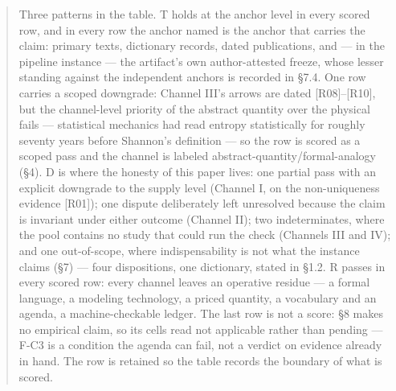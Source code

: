 \documentclass[11pt,a4paper]{article}
\begin{document}
\begin{abstract}
Three patterns in the table. T holds at the anchor level in every scored row, and in every row the anchor named is the anchor that carries the claim: primary texts, dictionary records, dated publications, and — in the pipeline instance — the artifact's own author-attested freeze, whose lesser standing against the independent anchors is recorded in §7.4. One row carries a scoped downgrade: Channel III's arrows are dated [R08]–[R10], but the channel-level priority of the abstract quantity over the physical fails — statistical mechanics had read entropy statistically for roughly seventy years before Shannon's definition — so the row is scored as a scoped pass and the channel is labeled abstract-quantity/formal-analogy (§4). D is where the honesty of this paper lives: one partial pass with an explicit downgrade to the supply level (Channel I, on the non-uniqueness evidence [R01]); one dispute deliberately left unresolved because the claim is invariant under either outcome (Channel II); two indeterminates, where the pool contains no study that could run the check (Channels III and IV); and one out-of-scope, where indispensability is not what the instance claims (§7) — four dispositions, one dictionary, stated in §1.2. R passes in every scored row: every channel leaves an operative residue — a formal language, a modeling technology, a priced quantity, a vocabulary and an agenda, a machine-checkable ledger. The last row is not a score: §8 makes no empirical claim, so its cells read not applicable rather than pending — F-C3 is a condition the agenda can fail, not a verdict on evidence already in hand. The row is retained so the table records the boundary of what is scored.


\end{abstract}
\end{document}
